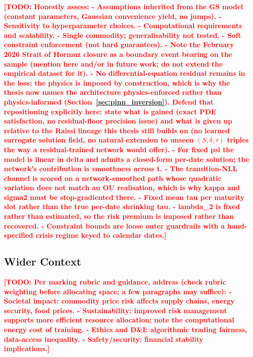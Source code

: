 \documentclass[11pt, a4paper]{article}
\newcommand{\todo}[1]{\textcolor{red}{\textbf{[TODO: #1]}}}
\begin{document}
\todo{Honestly assess:
  - Assumptions inherited from the GS model (constant parameters, Gaussian
    convenience yield, no jumps).
  - Sensitivity to hyperparameter choices.
  - Computational requirements and scalability.
  - Single commodity; generalisability not tested.
  - Soft constraint enforcement (not hard guarantees).
  - Note the February 2026 Strait of Hormuz closure as a boundary event bearing
    on the sample (mention here and/or in future work; do not extend the
    empirical dataset for it).
  - No differential-equation residual remains in the loss; the physics is
    imposed by construction, which is why the thesis now names the architecture
    physics-enforced rather than physics-informed (Section~\ref{sec:pinn_inversion}).
    Defend that repositioning explicitly here: state what is gained (exact PDE
    satisfaction, no residual-floor precision issue) and what is given up
    relative to the Raissi lineage this thesis still builds on (no learned
    surrogate solution field, no natural extension to unseen $(S,\delta,\tau)$
    triples the way a residual-trained network would offer).
  - For fixed psi the model is linear in delta and admits a closed-form per-date
    solution; the network's contribution is smoothness across t.
  - The transition-NLL channel is scored on a network-smoothed path whose
    quadratic variation does not match an OU realisation, which is why kappa and
    sigma2 must be stop-gradiented there.
  - Fixed mean tau per maturity slot rather than the true per-date shrinking tau.
  - lambda\_2 is fixed rather than estimated, so the risk premium is imposed
    rather than recovered.
  - Constraint bounds are loose outer guardrails with a hand-specified crisis
    regime keyed to calendar dates.}

\subsection{Wider Context}
\label{sec:disc_wider}

\todo{Per marking rubric and guidance, address (check rubric weighting before
  allocating space; a few paragraphs may suffice):
  - Societal impact: commodity price risk affects supply chains, energy
    security, food prices.
  - Sustainability: improved risk management supports more efficient resource
    allocation; note the computational energy cost of training.
  - Ethics and D\&I: algorithmic trading fairness, data-access inequality.
  - Safety/security: financial stability implications.}
\end{document}
